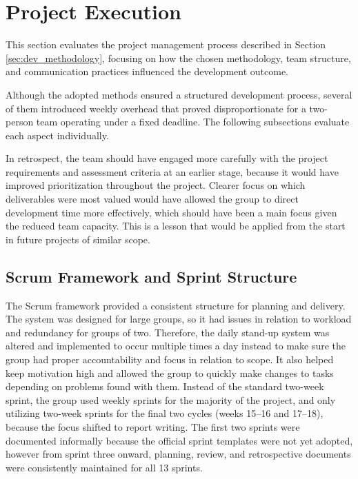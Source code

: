 
\section{Project Execution}

This section evaluates the project management process described in Section \ref{sec:dev_methodology}, focusing on how the chosen methodology, team structure, and communication practices influenced the development outcome.

Although the adopted methods ensured a structured development process, several of them introduced weekly overhead that proved disproportionate for a two-person team operating under a fixed deadline. The following subsections evaluate each aspect individually.

In retrospect, the team should have engaged more carefully with the project requirements and assessment criteria at an earlier stage, because it would have improved prioritization throughout the project. Clearer focus on which deliverables were most valued would have allowed the group to direct development time more effectively, which should have been a main focus given the reduced team capacity. This is a lesson that would be applied from the start in future projects of similar scope.

\subsection{Scrum Framework and Sprint Structure}

The Scrum framework provided a consistent structure for planning and delivery. The system was designed for large groups, so it had issues in relation to workload and redundancy for groups of two. Therefore, the daily stand-up system was altered and implemented to occur multiple times a day instead to make sure the group had proper accountability and focus in relation to scope. It also helped keep motivation high and allowed the group to quickly make changes to tasks depending on problems found with them. Instead of the standard two-week sprint, the group used weekly sprints for the majority of the project, and only utilizing two-week sprints for the final two cycles (weeks 15--16 and 17--18), because the focus shifted to report writing. The first two sprints were documented informally because the official sprint templates were not yet adopted, however from sprint three onward, planning, review, and retrospective documents were consistently maintained for all 13 sprints.

